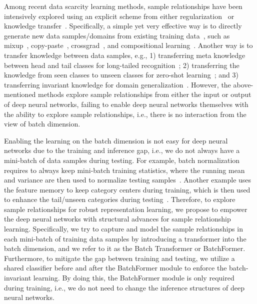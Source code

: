 \documentclass[10pt,twocolumn,letterpaper]{article}
\begin{document}
Among recent data scarcity learning methods, sample relationships have been intensively explored using an explicit scheme from either regularization~\cite{shankar2018generalizing, zhang2018mixup, li2021metasaug,ghiasi2021simple} or knowledge transfer~\cite{wang2017learning, wang2021rsg,zhu2020inflated}. Specifically, a simple yet very effective way is to directly generate new data samples/domains from existing training data~\cite{li2021metasaug}, such as mixup~\cite{zhang2018mixup},  copy-paste~\cite{ghiasi2021simple}, crossgrad~\cite{shankar2018generalizing}, and compositional learning~\cite{kato2018compositional, hou2020visual, atzmon2020causal, naeem2021learning}. Another way is to transfer knowledge between data samples, e.g., 1) transferring meta knowledge between head and tail classes for long-tailed recognition~\cite{wang2017learning, liu2019openlongtailrecognition}; 2) transferring the knowledge from seen classes to unseen classes for zero-shot learning~\cite{xian2018zero,naeem2021learning}; and 3)
transferring invariant knowledge for domain generalization~\cite{peng2019domain, arjovsky2019invariant, huang2020self}. However, the above-mentioned methods explore sample relationships from either the input or output of deep neural networks, failing to enable deep neural networks themselves with the ability to explore sample relationships, i.e., there is no interaction from the view of batch dimension.















Enabling the learning on the batch dimension is not easy for deep neural networks due to the training and inference gap, i.e., we do not always have a mini-batch of data samples during testing. For example, batch normalization requires to always keep mini-batch training statistics, where the running mean and variance are then used to normalize testing samples~\cite{ioffe2015batch}. Another example uses the feature memory to keep category centers during training, which is then used to enhance the tail/unseen categories during testing~\cite{liu2019openlongtailrecognition, zhu2020inflated}. Therefore, to explore sample relationships for robust representation learning, we propose to empower the deep neural networks with structural advances for sample relationship learning. Specifically, we try to capture and model the sample relationships in each mini-batch of training data samples by introducing a transformer into the batch dimension, and we refer to it as the Batch Transformer or BatchFormer. Furthermore, to mitigate the gap between training and testing, we utilize a shared classifier before and after the BatchFormer module to enforce the batch-invariant learning. By doing this, the BatchFormer module is only required during training, i.e., we do not need to change the inference structures of deep neural networks.
\end{document}
